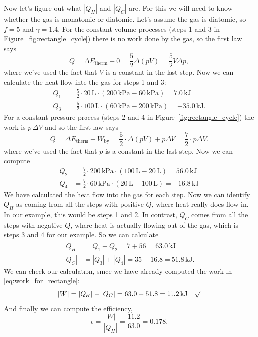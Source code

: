 Now let's figure out what $|Q_H|$ and $|Q_C|$ are.  For this we will
need to know whether the gas is monatomic or diatomic.  Let's assume
the gas is diatomic, so $f=5$ and $\gamma=1.4$.  For the constant
volume processes (steps 1 and 3 in Figure~\ref{fig:rectangle_cycle})
there is no work done by the gas, so the first law says
\begin{equation}
 Q = \Delta E_\text{therm}+ 0 = {\textstyle\frac{5}{2}} \Delta(pV)
 = \textstyle{\frac{5}{2}} V\Delta p,
\end{equation}
where we've used the fact that $V$ is a constant in the last step.
Now we can calculate the heat flow into the gas for steps 1 and 3:
\begin{align}
Q_1 &= {\textstyle\frac{5}{2}}\cdot  20\,\text{L}\cdot (200\,\text{kPa}-60\,\text{kPa}) =
7.0\,\text{kJ}\\
Q_3 &= {\textstyle\frac{5}{2}}\cdot  100\,\text{L} \cdot (60\,\text{kPa}-200\,\text{kPa}) =
-35.0\,\text{kJ}.
\end{align}
For a constant pressure process (steps 2 and 4 in
Figure~\ref{fig:rectangle_cycle}) the work is $p\, \Delta V$ and so the
first law says
\begin{equation}
Q = \Delta E_\text{therm}+ W_\text{by} = {\textstyle\frac{5}{2}}\cdot \Delta(pV) +
p\Delta V = {\textstyle\frac{7}{2}}\cdot  p\Delta V.
\end{equation}
where we've used the fact that $p$ is a constant in the last step.
Now we can compute
\begin{align}
Q_2 &= {\textstyle\frac{7}{2}}\cdot  200\,\text{kPa}\cdot (100\,\text{L} - 20\,\text{L})
 = 56.0\,\text{kJ} \\
Q_4 &= {\textstyle\frac{7}{2}}\cdot 60\,\text{kPa}\cdot (20\,\text{L} - 100\,\text{L})
 = -16.8\,\text{kJ} 
\end{align}
We have calculated the heat flow into the gas for each step.  Now we
can identify $Q_H$ as coming from all the steps with positive $Q$,
where heat really does flow in.  In our example, this would be steps 1
and 2.  In contrast, $Q_C$ comes from all the steps with negative $Q$,
where heat is actually flowing out of the gas, which is steps 3 and 4
for our example.  So we can calculate
\begin{align}
|Q_H| &= Q_1 + Q_2 = 7 + 56 = 63.0\,\text{kJ} \\
|Q_C| &= |Q_3| + |Q_4| = 35 + 16.8 = 51.8\,\text{kJ}.
\end{align}
We can check our calculation, since we have already computed the work
in \eqref{eq:work_for_rectangle}:
\begin{equation}
|W| = |Q_H|-|Q_C| = 63.0 - 51.8 = 11.2\,\text{kJ} \quad \surd
\end{equation}
And finally we can compute the efficiency,
\begin{equation}
\epsilon = \frac{|W|}{|Q_H|} = \frac{11.2}{63.0} = 0.178.
\end{equation}

